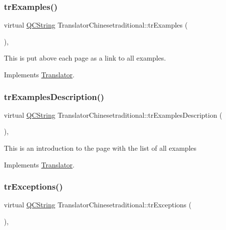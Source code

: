 \subsubsection{\texorpdfstring{trExamples()}{trExamples()}}
{\footnotesize\ttfamily virtual \mbox{\hyperlink{class_q_c_string}{Q\+C\+String}} Translator\+Chinesetraditional\+::tr\+Examples (\begin{DoxyParamCaption}{ }\end{DoxyParamCaption})\hspace{0.3cm}{\ttfamily [inline]}, {\ttfamily [virtual]}}

This is put above each page as a link to all examples. 

Implements \mbox{\hyperlink{class_translator}{Translator}}.

\mbox{\label{class_translator_chinesetraditional_ad43b688fcc63d744ab0631338551b334}} 
\subsubsection{\texorpdfstring{trExamplesDescription()}{trExamplesDescription()}}
{\footnotesize\ttfamily virtual \mbox{\hyperlink{class_q_c_string}{Q\+C\+String}} Translator\+Chinesetraditional\+::tr\+Examples\+Description (\begin{DoxyParamCaption}{ }\end{DoxyParamCaption})\hspace{0.3cm}{\ttfamily [inline]}, {\ttfamily [virtual]}}

This is an introduction to the page with the list of all examples 

Implements \mbox{\hyperlink{class_translator}{Translator}}.

\mbox{\label{class_translator_chinesetraditional_ad24c0dcf0138acddae4d8ecf43f4717d}} 
\subsubsection{\texorpdfstring{trExceptions()}{trExceptions()}}
{\footnotesize\ttfamily virtual \mbox{\hyperlink{class_q_c_string}{Q\+C\+String}} Translator\+Chinesetraditional\+::tr\+Exceptions (\begin{DoxyParamCaption}{ }\end{DoxyParamCaption})\hspace{0.3cm}{\ttfamily [inline]}, {\ttfamily [virtual]}}

